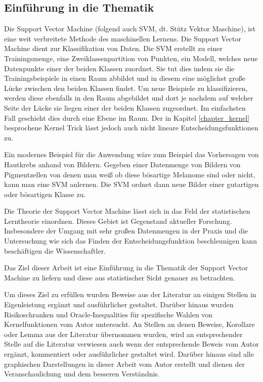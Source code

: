 \documentclass{article}
\theoremstyle{plain}
\theoremstyle{definition}
\begin{document}
\subsection{Einführung in die Thematik}
    Die Support Vector Machine (folgend auch SVM, dt. Stütz Vektor Maschine), ist eine weit verbreitete Methode des maschinellen Lernens. Die Support Vector Machine dient zur Klassifikation von Daten. Die SVM erstellt zu einer Trainingsmenge, eine Zweiklassenpartition von Punkten, ein Modell, welches neue Datenpunkte einer der beiden Klassen zuordnet. Sie tut dies indem sie die Trainingsbeispiele in einen Raum abbildet und in diesem eine möglichst große Lücke zwischen den beiden Klassen findet. Um neue Beispiele zu klassifizieren, werden diese ebenfalls in den Raum abgebildet und dort je nachdem auf welcher Seite der Lücke sie liegen einer der beiden Klassen zugeordnet.
    Im einfachsten Fall geschieht dies durch eine Ebene im Raum. Der in Kapitel \ref{chapter_kernel} besprochene Kernel Trick lässt jedoch auch nicht lineare Entscheidungsfunktionen zu.
    
    Ein modernes Beispiel für die Anwendung wäre zum Beispiel das Vorhersagen von Hautkrebs anhand von Bildern. Gegeben einer Datenmenge von Bildern von Pigmentzellen von denen man weiß ob diese bösartige Melanome sind oder nicht, kann man eine SVM anlernen. Die SVM ordnet dann neue Bilder einer gutartigen oder bösartigen Klasse zu.
    
    Die Theorie der Support Vector Machine lässt sich in das Feld der statistischen Lerntheorie einordnen. Dieses Gebiet ist Gegenstand aktueller Forschung. Insbesondere der Umgang mit sehr großen Datenmengen in der Praxis und die Untersuchung wie sich das Finden der Entscheidungsfunktion beschleunigen kann beschäftigen die Wissenschaftler.
    
    Das Ziel dieser Arbeit ist eine Einführung in die Thematik der Support Vector Machine zu liefern und diese aus statistischer Sicht genauer zu betrachten.
    
    Um dieses Ziel zu erfüllen wurden Beweise aus der Literatur an einigen Stellen in Eigenleistung ergänzt und ausführlicher gestaltet. Darüber hinaus wurden Risikoschranken und Oracle-Inequalities für spezifische Wahlen von Kernelfunktionen vom Autor untersucht. An Stellen an denen Beweise, Korollare oder Lemma aus der Literatur übernommen wurden, wird an entsprechender Stelle auf die Literatur verwiesen auch wenn der entsprechende Beweis vom Autor ergänzt, kommentiert oder ausführlicher gestaltet wird. Darüber hinaus sind alle graphischen Darstellungen in dieser Arbeit vom Autor erstellt und dienen der Veranschaulichung und dem besseren Verständnis. 
    
\end{document}
